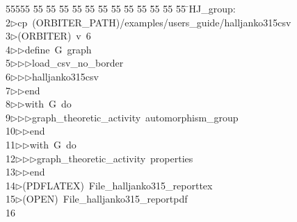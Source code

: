 %
%
\begin{tabbing}
55555 \= 55 \= 55 \= 55 \= 55 \= 55 \= 55 \= 55 \= 55 \= 55 \= 55 \= 55 \= 55 \= \>HJ\_group:\\[0pt]
2\>$\triangleright$\>cp\ (ORBITER\_PATH)/examples/users\_guide/halljanko315csv\ \\[0pt]
3\>$\triangleright$\>(ORBITER)\ v\ 6\ \\[0pt]
4\>$\triangleright$\>$\triangleright$\>define\ G\ graph\ \\[0pt]
5\>$\triangleright$\>$\triangleright$\>$\triangleright$\>load\_csv\_no\_border\ \\[0pt]
6\>$\triangleright$\>$\triangleright$\>$\triangleright$\>halljanko315csv\ \\[0pt]
7\>$\triangleright$\>$\triangleright$\>end\ \\[0pt]
8\>$\triangleright$\>$\triangleright$\>with\ G\ do\ \\[0pt]
9\>$\triangleright$\>$\triangleright$\>$\triangleright$\>graph\_theoretic\_activity\ automorphism\_group\ \\[0pt]
10\>$\triangleright$\>$\triangleright$\>end\ \\[0pt]
11\>$\triangleright$\>$\triangleright$\>with\ G\ do\ \\[0pt]
12\>$\triangleright$\>$\triangleright$\>$\triangleright$\>graph\_theoretic\_activity\ properties\ \\[0pt]
13\>$\triangleright$\>$\triangleright$\>end\\[0pt]
14\>$\triangleright$\>(PDFLATEX)\ File\_halljanko315\_reporttex\\[0pt]
15\>$\triangleright$\>(OPEN)\ File\_halljanko315\_reportpdf\\[0pt]
16\>\end{tabbing}
